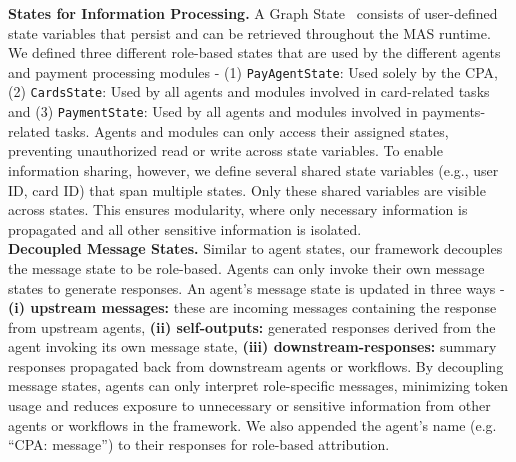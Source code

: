 \documentclass[runningheads]{llncs}
\begin{document}
\noindent\textbf{States for Information Processing.}
A Graph State~\cite{langchain2024langgraph} consists of user-defined state variables that persist and can be retrieved throughout the MAS runtime. We defined three different role-based states that are used by the different agents and payment processing modules - (1) \texttt{PayAgentState}: Used solely by the CPA, (2) \texttt{CardsState}: Used by all agents and modules involved in card-related tasks and (3) \texttt{PaymentState}: Used by all agents and modules involved in payments-related tasks. 
Agents and modules can only access their assigned states, preventing unauthorized read or write across state variables. To enable information sharing, however, we define several shared state variables (e.g., user ID, card ID) that span multiple states. Only these shared variables are visible across states. This ensures modularity, where only necessary information is propagated and all other sensitive information is isolated. \\

\noindent\textbf{Decoupled Message States.}
Similar to agent states, our framework decouples the message state to be role-based. Agents can only invoke their own message states to generate responses. 
An agent's message state is updated in three ways - \textbf{(i) upstream messages:} these are incoming messages containing the response from upstream agents, \textbf{(ii) self-outputs:} generated responses derived from the agent invoking its own message state, \textbf{(iii) downstream-responses:} summary responses propagated back from downstream agents or workflows. By decoupling message states, agents can only interpret role-specific messages, minimizing token usage and reduces exposure to unnecessary or sensitive information from other agents or workflows in the framework. We also appended the agent's name (e.g. ``CPA: message'') to their responses for role-based attribution.\\
\end{document}
